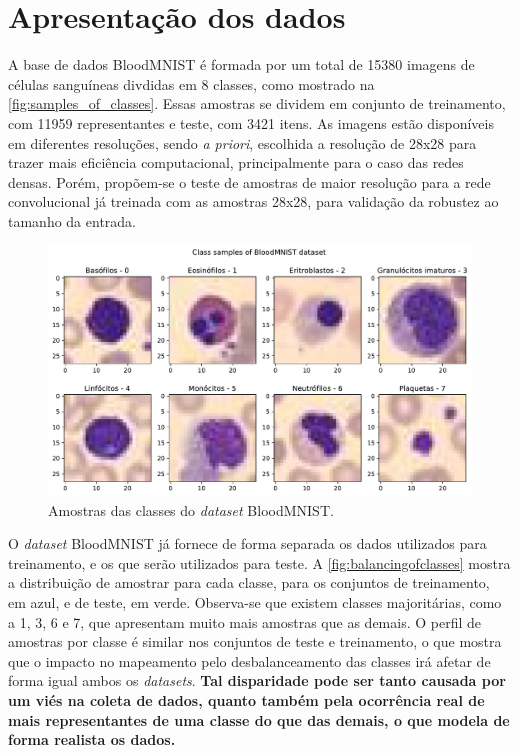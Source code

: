 \section{Apresentação dos dados}

A base de dados BloodMNIST é formada por um total de 15380 imagens de células sanguíneas divdidas em 8 classes, como mostrado na \autoref{fig:samples_of_classes}. Essas amostras se dividem em conjunto de treinamento, com 11959 representantes e teste, com 3421 itens. As imagens estão disponíveis em diferentes resoluções, sendo \textit{a priori}, escolhida a resolução de 28x28 para trazer mais eficiência computacional, principalmente para o caso das redes densas. Porém, propõem-se o teste de amostras de maior resolução para a rede convolucional já treinada com as amostras 28x28, para validação da robustez ao tamanho da entrada.

\begin{figure}[H]
	\centering
	\includegraphics[width=0.75\linewidth]{../../plot/samples_of_classes}
	\caption{Amostras das classes do \textit{dataset} BloodMNIST.}
	\label{fig:samples_of_classes}
\end{figure}

O \textit{dataset} BloodMNIST já fornece de forma separada os dados utilizados para treinamento, e os que serão utilizados para teste. A \autoref{fig:balancingofclasses} mostra a distribuição de amostrar para cada classe, para os conjuntos de treinamento, em azul, e de teste, em verde. Observa-se que existem classes majoritárias, como a 1, 3, 6 e 7, que apresentam muito mais amostras que as demais. O perfil de amostras por classe é similar nos conjuntos de teste e treinamento, o que mostra que o impacto no mapeamento pelo desbalanceamento das classes irá afetar de forma igual ambos os \textit{datasets}. \textbf{Tal disparidade pode ser tanto causada por um viés na coleta de dados, quanto também pela ocorrência real de mais representantes de uma classe do que das demais, o que modela de forma realista os dados.}

